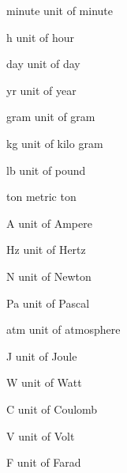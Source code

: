 \begin{datadesc}{minute}
  unit of minute
\end{datadesc}

\begin{datadesc}{h}
unit of hour 
\end{datadesc}
\begin{datadesc}{day}
unit of day 
\end{datadesc}
\begin{datadesc}{yr}
 unit of year
\end{datadesc}

\begin{datadesc}{gram}
unit of gram
\end{datadesc}
\begin{datadesc}{kg}
unit of kilo gram
 \end{datadesc}
\begin{datadesc}{lb}
unit of pound 
\end{datadesc}
\begin{datadesc}{ton}
 metric ton
\end{datadesc}

\begin{datadesc}{A}
 unit of Ampere
\end{datadesc}

\begin{datadesc}{Hz}
 unit of Hertz
\end{datadesc}

\begin{datadesc}{N}
 unit of Newton
\end{datadesc}
\begin{datadesc}{Pa}
unit of Pascal 
\end{datadesc}
\begin{datadesc}{atm}
unit of atmosphere 
\end{datadesc}
\begin{datadesc}{J}
unit of Joule 
\end{datadesc}

\begin{datadesc}{W}
unit of Watt 
\end{datadesc}

\begin{datadesc}{C}
unit of Coulomb 
\end{datadesc}
\begin{datadesc}{V}
unit of Volt 
\end{datadesc}
\begin{datadesc}{F}
 unit of Farad 
\end{datadesc}

